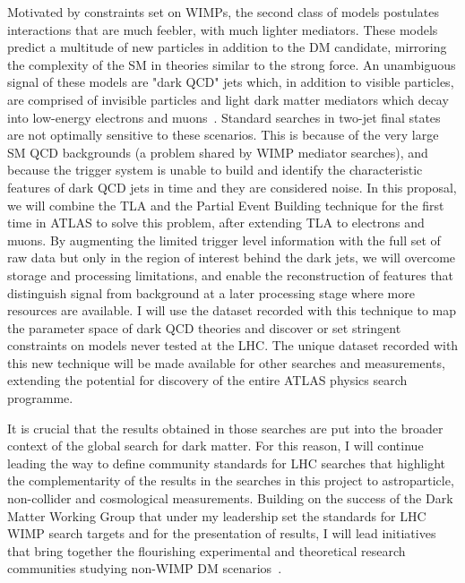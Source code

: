 \documentclass[11pt,a4paper]{article}
\begin{document}
Motivated by constraints set on WIMPs, the second class of models postulates interactions that are much feebler, with much lighter mediators. 
These models~\cite{Strassler:2006im,Cohen:2017pzm} predict a multitude of new particles in addition to the DM candidate, mirroring the complexity of the SM in theories similar to the strong force. 
An unambiguous signal of these models are "dark QCD" jets which, in addition to visible particles, are comprised of invisible particles and light dark matter mediators which decay into low-energy electrons and muons~\cite{Curtin:2014cca}. 
Standard searches in two-jet final states are not optimally sensitive to these scenarios. %
This is because of the very large SM QCD backgrounds (a problem shared by WIMP mediator searches), and because the trigger system is unable to build and identify the characteristic features of dark QCD jets in time and they are considered noise. 
In this proposal, we will combine the TLA and the Partial Event Building technique for the first time in ATLAS to solve this problem, after extending TLA to electrons and muons. %
By augmenting the limited trigger level information with the full set of raw data but only in the region of interest behind the dark jets, we will overcome storage and processing limitations, and enable the reconstruction of features that distinguish signal from background at a later processing stage where more resources are available. 
I will use the dataset recorded with this technique to map the parameter space of dark QCD theories and discover or set stringent constraints on models never tested at the LHC. 
The unique dataset recorded with this new technique will be made available for other searches and measurements, extending the potential for discovery of the entire ATLAS physics search programme. 

It is crucial that the results obtained in those searches are put into the broader context of the global search for dark matter. 
For this reason, I will continue leading the way to define community standards for LHC searches that highlight the complementarity of the results in the searches in this project to astroparticle, non-collider and cosmological measurements. 
Building on the success of the Dark Matter Working Group that under my leadership set the standards for LHC WIMP search targets and for the presentation of results, I will lead initiatives that bring together the flourishing experimental and theoretical research communities studying non-WIMP DM scenarios~\cite{iDMEu}. 
\end{document}
